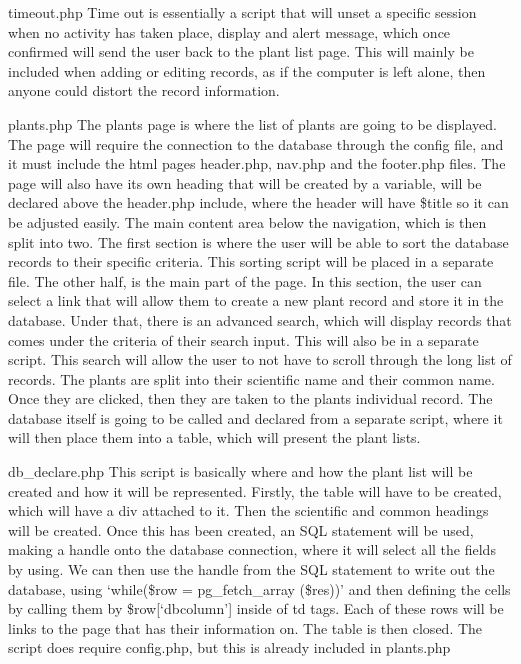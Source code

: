 timeout.php
Time out is essentially a script that will unset a specific session when no activity has taken place, display and alert message, which once confirmed will send the user back to the plant list page. This will mainly be included when adding or editing records, as if the computer is left alone, then anyone could distort the record information.

plants.php
The plants page is where the list of plants are going to be displayed. The page will require the connection to the database through the config file, and it must include the html pages header.php, nav.php and the footer.php files.  The page will also have its own heading that will be created by a variable, will be declared above the header.php include, where the header will have \$title so it can be adjusted easily. The main content area below the navigation, which is then split into two. The first section is where the user will be able to sort the database records to their specific criteria. This sorting script will be placed in a separate file. The other half, is the main part of the page. In this section, the user can select a link that will allow them to create a new plant record and store it in the database. Under that, there is an advanced search, which will display records that comes under the criteria of their search input. This will also be in a separate script. This search will allow the user to not have to scroll through the long list of records. The plants are split into their scientific name and their common name. Once they are clicked, then they are taken to the plants individual record. The database itself is going to be called and declared from a separate script, where it will then place them into a table, which will present the plant lists.

db\_declare.php
This script is basically where and how the plant list will be created and how it will be represented. Firstly, the table will have to be created, which will have a div attached to it. Then the scientific and common headings will be created. Once this has been created, an SQL statement will be used, making a handle onto the database connection, where it will select all the fields by using.  We can then use the handle from the SQL statement to write out the database, using `while(\$row = pg\_fetch\_array (\$res))' and then defining the cells by calling them by \$row[`dbcolumn'] inside of td tags.  Each of these rows will be links to the page that has their information on. The table is then closed. The script does require config.php, but this is already included in plants.php


